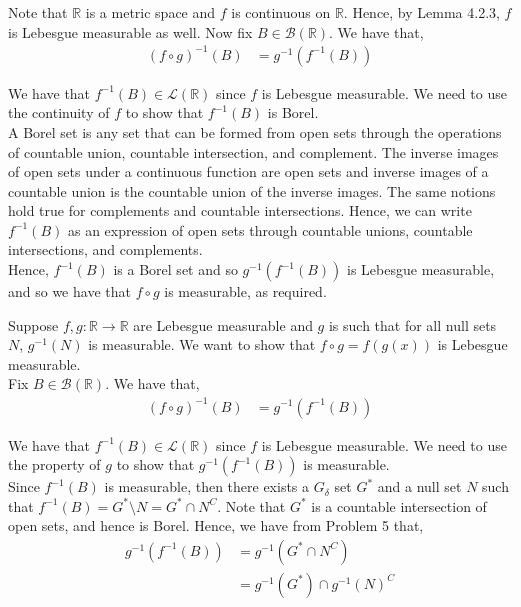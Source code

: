 \documentclass[12pt]{article}
\newenvironment{problem}[2][Problem]{\begin{trivlist}
\item[\hskip \labelsep {\bfseries #1}\hskip \labelsep {\bfseries #2.}]}{\end{trivlist}}
\begin{document}
Note that $\mathbb{R}$ is a metric space and $f$ is continuous on $\mathbb{R}$. Hence, by Lemma 4.2.3, $f$ is Lebesgue measurable as well. Now fix $B \in \mathcal{B}(\mathbb{R})$. We have that,
\begin{align*}
(f \circ g)^{-1}(B) &= g^{-1}(f^{-1}(B))
\end{align*} 

We have that $f^{-1}(B) \in \mathcal{L}(\mathbb{R})$ since $f$ is Lebesgue measurable. We need to use the continuity of $f$ to show that $f^{-1}(B)$ is Borel.\\

A Borel set is any set that can be formed from open sets through the operations of countable union, countable intersection, and complement. The inverse images of open sets under a continuous function are open sets and inverse images of a countable union is the countable union of the inverse images. The same notions hold true for complements and countable intersections. Hence, we can write $f^{-1}(B)$ as an expression of open sets through countable unions, countable intersections, and complements.\\

Hence, $f^{-1}(B)$ is a Borel set and so $g^{-1}(f^{-1}(B))$ is Lebesgue measurable, and so we have that $f \circ g$ is measurable, as required.

\begin{problem}{8}
\end{problem}

Suppose $f, g: \mathbb{R} \to \mathbb{R}$ are Lebesgue measurable and $g$ is such that for all null sets $N$, $g^{-1}(N)$ is measurable. We want to show that $f \circ g = f(g(x))$ is Lebesgue measurable.\\

Fix $B \in \mathcal{B}(\mathbb{R})$. We have that,
\begin{align*}
(f \circ g)^{-1}(B) &= g^{-1}(f^{-1}(B))
\end{align*} 

We have that $f^{-1}(B) \in \mathcal{L}(\mathbb{R})$ since $f$ is Lebesgue measurable. We need to use the property of $g$ to show that $g^{-1}(f^{-1}(B))$ is measurable.\\

Since $f^{-1}(B)$ is measurable, then there exists a $G_{\delta}$ set $G^*$ and a null set $N$ such that $f^{-1}(B) = G^* \setminus N = G^* \cap N^C$. Note that $G^*$ is a countable intersection of open sets, and hence is Borel. Hence, we have from Problem 5 that,
\begin{align*}
g^{-1}(f^{-1}(B)) &= g^{-1}(G^* \cap N^C)\\
&= g^{-1}(G^*) \cap g^{-1}(N)^C
\end{align*}
\end{document}
